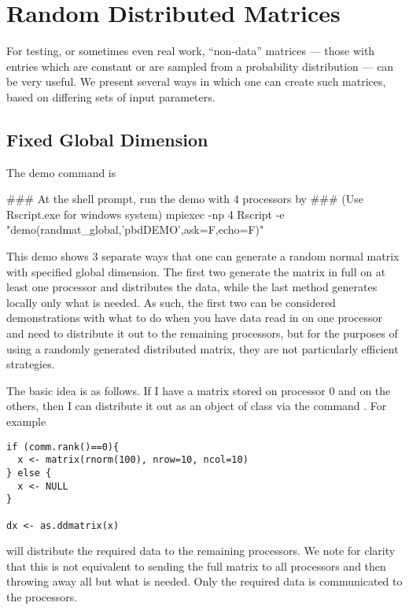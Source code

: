 \section{Random Distributed Matrices}
\label{sec:reader}

For testing, or sometimes even real work, ``non-data'' matrices --- those with entries which are constant or are sampled from a probability distribution --- can be very useful.  We present several ways in which one can create such matrices, based on differing sets of input parameters.

\subsection{Fixed Global Dimension}\label{subsec:rng.gl}

The demo command is
\begin{Command}
### At the shell prompt, run the demo with 4 processors by
### (Use Rscript.exe for windows system)
mpiexec -np 4 Rscript -e "demo(randmat_global,'pbdDEMO',ask=F,echo=F)"
\end{Command}

This demo shows 3 separate ways that one can generate a random normal matrix with specified global dimension.  The first two generate the matrix in full on at least one processor and distributes the data, while the last method generates locally only what is needed.  As such, the first two can be considered demonstrations with what to do when you have data read in on one processor and need to distribute it out to the remaining processors, but for the purposes of using a randomly generated distributed matrix, they are not particularly efficient strategies.

The basic idea is as follows.  If I have a matrix  stored on processor 0 and  on the others, then I can distribute it out as an object of class  via the command .  For example
\begin{lstlisting}[language=rr]
if (comm.rank()==0){
  x <- matrix(rnorm(100), nrow=10, ncol=10)
} else {
  x <- NULL
}

dx <- as.ddmatrix(x)
\end{lstlisting}

will distribute the required data to the remaining processors.  We note for clarity that this is not equivalent to sending the full matrix to all processors and then throwing away all but what is needed.  Only the required data is communicated to the processors.

